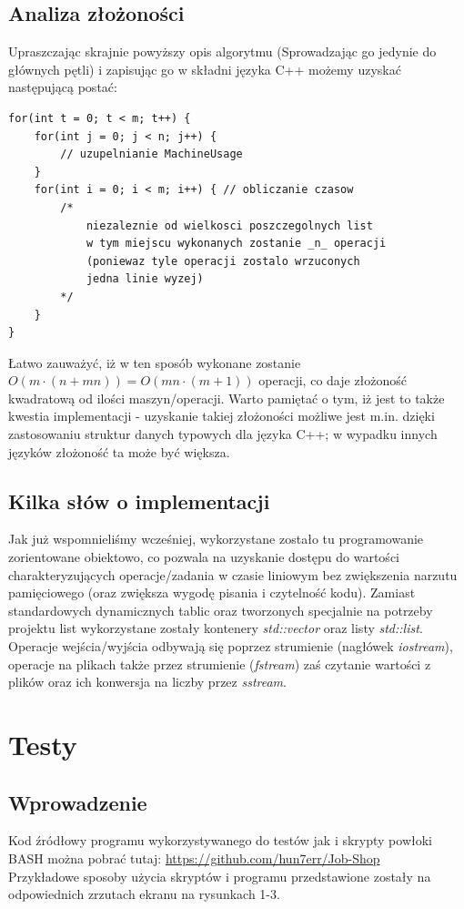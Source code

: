 \documentclass[a4paper,11pt]{article}
\begin{document}
\subsection{Analiza złożoności}
Upraszczając skrajnie powyższy opis algorytmu (Sprowadzając go jedynie do głównych pętli) i zapisując go w składni języka C++ możemy uzyskać następującą postać:\\
\begin{lstlisting}
for(int t = 0; t < m; t++) {
	for(int j = 0; j < n; j++) {
		// uzupelnianie MachineUsage
	}
	for(int i = 0; i < m; i++) { // obliczanie czasow
		/*
			niezaleznie od wielkosci poszczegolnych list
			w tym miejscu wykonanych zostanie _n_ operacji	
			(poniewaz tyle operacji zostalo wrzuconych
			jedna linie wyzej)
		*/
	}
}
\end{lstlisting}
Łatwo zauważyć, iż w ten sposób wykonane zostanie \emph{$O(m \cdot (n + mn)) = O(mn \cdot (m + 1))$} operacji, co daje złożoność kwadratową od ilości maszyn/operacji. Warto pamiętać o tym, iż jest to także kwestia implementacji - uzyskanie takiej złożoności możliwe jest m.in. dzięki zastosowaniu struktur danych typowych dla języka C++; w wypadku innych języków złożoność ta może być większa.
\subsection{Kilka słów o implementacji}
Jak już wspomnieliśmy wcześniej, wykorzystane zostało tu programowanie zorientowane obiektowo, co pozwala na uzyskanie dostępu do wartości charakteryzujących operacje/zadania w czasie liniowym bez zwiększenia narzutu pamięciowego (oraz zwiększa wygodę pisania i czytelność kodu). Zamiast standardowych dynamicznych tablic oraz tworzonych specjalnie na potrzeby projektu list wykorzystane zostały kontenery \emph{std::vector} oraz listy \emph{std::list}. Operacje wejścia/wyjścia odbywają się poprzez strumienie (nagłówek \emph{iostream}), operacje na plikach także przez strumienie (\emph{fstream}) zaś czytanie wartości z plików oraz ich konwersja na liczby przez \emph{sstream}.
\section{Testy}
\subsection{Wprowadzenie}
Kod źródłowy programu wykorzystywanego do testów jak i skrypty powłoki BASH można pobrać tutaj: \url{https://github.com/hun7err/Job-Shop}\\
Przykładowe sposoby użycia skryptów i programu przedstawione zostały na odpowiednich zrzutach ekranu na rysunkach 1-3.
\end{document}
